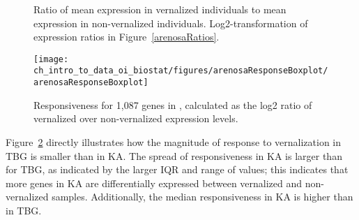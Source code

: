 \begin{figure}[h]
	\centering
	\caption{ Ratio of mean expression in vernalized individuals to mean expression in non-vernalized individuals.  Log2-transformation of expression ratios in Figure~\ref{arenosaRatios}.}
	\label{arenosaRatioTables}
\end{figure}

\textD{\newpage}

\begin{figure}[h]
	\centering
	\texttt{[image: ch\_intro\_to\_data\_oi\_biostat/figures/arenosaResponseBoxplot/arenosaResponseBoxplot]}
	\caption{Responsiveness for 1,087 genes in , calculated as the log2 ratio of vernalized over non-vernalized expression levels.}
	\label{arenosaResponseBoxplot}
\end{figure}

Figure~\ref{arenosaResponseBoxplot} directly illustrates how the magnitude of response to vernalization in TBG is smaller than in KA. The spread of responsiveness in KA is larger than for TBG, as indicated by the larger IQR and range of values; this indicates that more genes in KA are differentially expressed between vernalized and non-vernalized samples. Additionally, the median responsiveness in KA is higher than in TBG.

